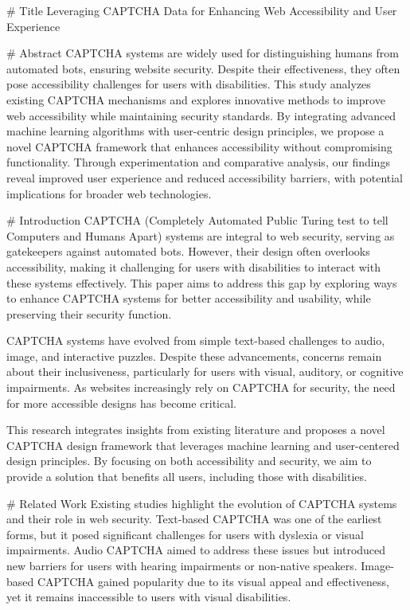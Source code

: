 # Title  
Leveraging CAPTCHA Data for Enhancing Web Accessibility and User Experience  

# Abstract  
CAPTCHA systems are widely used for distinguishing humans from automated bots, ensuring website security. Despite their effectiveness, they often pose accessibility challenges for users with disabilities. This study analyzes existing CAPTCHA mechanisms and explores innovative methods to improve web accessibility while maintaining security standards. By integrating advanced machine learning algorithms with user-centric design principles, we propose a novel CAPTCHA framework that enhances accessibility without compromising functionality. Through experimentation and comparative analysis, our findings reveal improved user experience and reduced accessibility barriers, with potential implications for broader web technologies.  

# Introduction  
CAPTCHA (Completely Automated Public Turing test to tell Computers and Humans Apart) systems are integral to web security, serving as gatekeepers against automated bots. However, their design often overlooks accessibility, making it challenging for users with disabilities to interact with these systems effectively. This paper aims to address this gap by exploring ways to enhance CAPTCHA systems for better accessibility and usability, while preserving their security function.  

CAPTCHA systems have evolved from simple text-based challenges to audio, image, and interactive puzzles. Despite these advancements, concerns remain about their inclusiveness, particularly for users with visual, auditory, or cognitive impairments. As websites increasingly rely on CAPTCHA for security, the need for more accessible designs has become critical.  

This research integrates insights from existing literature and proposes a novel CAPTCHA design framework that leverages machine learning and user-centered design principles. By focusing on both accessibility and security, we aim to provide a solution that benefits all users, including those with disabilities.  

# Related Work  
Existing studies highlight the evolution of CAPTCHA systems and their role in web security. Text-based CAPTCHA was one of the earliest forms, but it posed significant challenges for users with dyslexia or visual impairments. Audio CAPTCHA aimed to address these issues but introduced new barriers for users with hearing impairments or non-native speakers. Image-based CAPTCHA gained popularity due to its visual appeal and effectiveness, yet it remains inaccessible to users with visual disabilities.  

